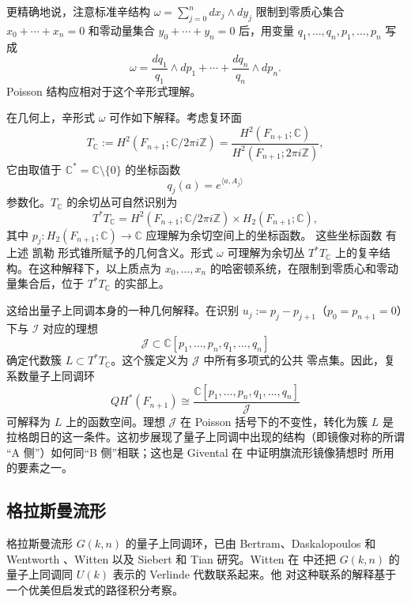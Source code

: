 更精确地说，注意标准辛结构
$\omega=\sum_{j=0}^ndx_j\wedge dy_j$ 限制到零质心集合
$x_0+\cdots+x_n=0$ 和零动量集合 $y_0+\cdots+y_n=0$ 后，用变量
$q_1,\ldots,q_n,p_1,\ldots,p_n$ 写成
\[
  \omega=\frac{dq_1}{q_1}\wedge dp_1+\cdots+
  \frac{dq_n}{q_n}\wedge dp_n.
\]
Poisson 结构应相对于这个辛形式理解。

在几何上，辛形式 $\omega$ 可作如下解释。考虑复环面
\[
  T_{\mathbb C}:=H^2(F_{n+1};\mathbb C/2\pi i\mathbb Z)
  =\frac{H^2(F_{n+1};\mathbb C)}{H^2(F_{n+1};2\pi i\mathbb Z)},
\]
它由取值于 $\mathbb C^*=\mathbb C\setminus\{0\}$ 的坐标函数
\[
  q_j(a)=e^{\langle a,A_j\rangle}
\]
参数化。$T_{\mathbb C}$ 的余切丛可自然识别为
\[
  T^*T_{\mathbb C}
  =H^2(F_{n+1};\mathbb C/2\pi i\mathbb Z)
  \times H_2(F_{n+1};\mathbb C),
\]
其中 $p_j:H_2(F_{n+1};\mathbb C)\to\mathbb C$ 应理解为余切空间上的坐标函数。
这些坐标函数
有上述 凯勒 形式锥所赋予的几何含义。形式 $\omega$ 可理解为余切丛
$T^*T_{\mathbb C}$ 上的复辛结构。在这种解释下，以上质点为
$x_0,\ldots,x_n$ 的哈密顿系统，在限制到零质心和零动量集合后，位于
$T^*T_{\mathbb C}$ 的实部上。

这给出量子上同调本身的一种几何解释。在识别
$u_j:=p_j-p_{j+1}$（$p_0=p_{n+1}=0$）下与 $\mathcal I$ 对应的理想
\[
  \mathcal J\subset\mathbb C[p_1,\ldots,p_n,q_1,\ldots,q_n]
\]
确定代数簇 $L\subset T^*T_{\mathbb C}$。这个簇定义为 $\mathcal J$ 中所有多项式的公共
零点集。因此，复系数量子上同调环
\[
  QH^*(F_{n+1})\cong
  \frac{\mathbb C[p_1,\ldots,p_n,q_1,\ldots,q_n]}{\mathcal J}
\]
可解释为 $L$ 上的函数空间。理想 $\mathcal J$ 在 Poisson 括号下的不变性，转化为簇
$L$ 是拉格朗日的这一条件。这初步展现了量子上同调中出现的结构（即镜像对称的所谓
“A 侧”）如何同“B 侧”相联；这也是 Givental 在  中证明旗流形镜像猜想时
所用的要素之一。

\subsection{格拉斯曼流形}\label{subsec:11-3-3}

格拉斯曼流形 $G(k,n)$ 的量子上同调环，已由 Bertram、Daskalopoulos 和 Wentworth
、Witten  以及 Siebert 和 Tian  研究。Witten 在
 中还把 $G(k,n)$ 的量子上同调同 $U(k)$ 表示的 Verlinde 代数联系起来。他
对这种联系的解释基于一个优美但启发式的路径积分考察。

